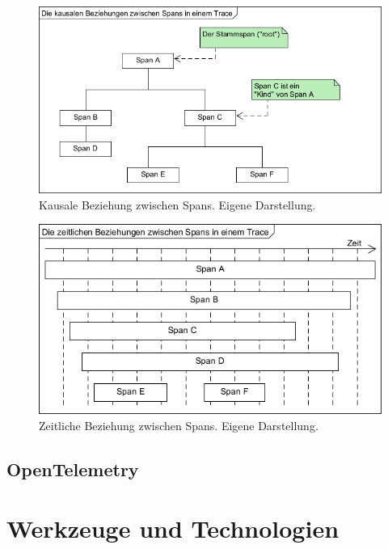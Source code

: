 \begin{figure}[H]
	\centering
	\includegraphics[width=0.75\linewidth]{img/03_methoden/otel_causal-relationship.png}
	\caption{Kausale Beziehung zwischen Spans. Eigene Darstellung.}
	\label{fig:otel-causal-relationship}
\end{figure}
 
\begin{figure}[H]
	\centering
	\includegraphics[width=0.75\linewidth]{img/03_methoden/otel_temporal-relationship}
	\caption{Zeitliche Beziehung zwischen Spans. Eigene Darstellung.}
	\label{fig:otel-temporal-relationship}
\end{figure}

\subsection{OpenTelemetry}
\label{subsec:opentelemetry}




\section{Werkzeuge und Technologien}
\label{sec:werkzeuge-und-technologien}
